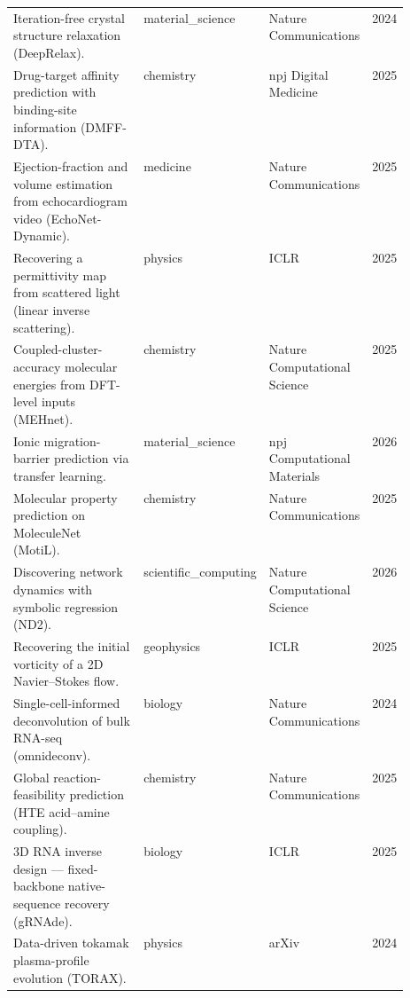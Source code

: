 \begin{landscape}
\begin{longtable}{@{}p{0.52\linewidth} l l c@{}}
\addlinespace
Iteration-free crystal structure relaxation (DeepRelax). & material\_science & Nature Communications & 2024 \\
\addlinespace
Drug-target affinity prediction with binding-site information (DMFF-DTA). & chemistry & npj Digital Medicine & 2025 \\
\addlinespace
Ejection-fraction and volume estimation from echocardiogram video (EchoNet-Dynamic). & medicine & Nature Communications & 2025 \\
\addlinespace
Recovering a permittivity map from scattered light (linear inverse scattering). & physics & ICLR & 2025 \\
\addlinespace
Coupled-cluster-accuracy molecular energies from DFT-level inputs (MEHnet). & chemistry & Nature Computational Science & 2025 \\
\addlinespace
Ionic migration-barrier prediction via transfer learning. & material\_science & npj Computational Materials & 2026 \\
\addlinespace
Molecular property prediction on MoleculeNet (MotiL). & chemistry & Nature Communications & 2025 \\
\addlinespace
Discovering network dynamics with symbolic regression (ND2). & scientific\_computing & Nature Computational Science & 2026 \\
\addlinespace
Recovering the initial vorticity of a 2D Navier--Stokes flow. & geophysics & ICLR & 2025 \\
\addlinespace
Single-cell-informed deconvolution of bulk RNA-seq (omnideconv). & biology & Nature Communications & 2024 \\
\addlinespace
Global reaction-feasibility prediction (HTE acid--amine coupling). & chemistry & Nature Communications & 2025 \\
\addlinespace
3D RNA inverse design --- fixed-backbone native-sequence recovery (gRNAde). & biology & ICLR & 2025 \\
\addlinespace
Data-driven tokamak plasma-profile evolution (TORAX). & physics & arXiv & 2024 \\

\end{longtable}
\end{landscape}